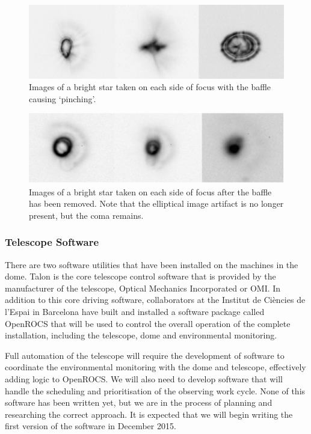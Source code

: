 \documentclass[a4paper,fleqn,usenatbib]{mnras}
\begin{document}
\begin{figure}
	\includegraphics[width=\columnwidth]{images/ellipse.png}
    \caption{Images of a bright star taken on each side of focus with the baffle causing `pinching'.}
    \label{fig:ellipse}
\end{figure}

\begin{figure}
	\includegraphics[width=\columnwidth]{images/ellipse-corrected.png}
    \caption{Images of a bright star taken on each side of focus after the baffle has been removed. Note that the elliptical image artifact is no longer present, but the coma remains.}
    \label{fig:ellipse-corrected}
\end{figure}


\subsubsection{Telescope Software}
There are two software utilities that have been installed on the machines in the dome. Talon is the core telescope control software that is provided by the manufacturer of the telescope, Optical Mechanics Incorporated or OMI. In addition to this core driving software, collaborators at the Institut de Ci\`{e}ncies de l'Espai in Barcelona have built and installed a software package called OpenROCS that will be used to control the overall operation of the complete installation, including the telescope, dome and environmental monitoring. 

Full automation of the telescope will require the development of software to coordinate the environmental monitoring with the dome and telescope, effectively adding logic to OpenROCS. We will also need to develop software that will handle the scheduling and prioritisation of the observing work cycle. None of this software has been written yet, but we are in the process of planning and researching the correct approach. It is expected that we will begin writing the first version of the software in December 2015. 
\end{document}
